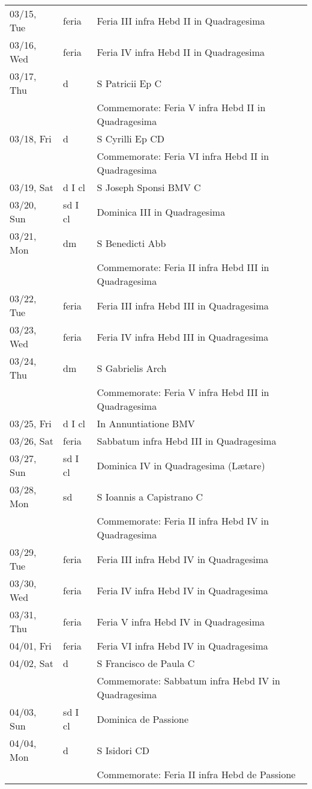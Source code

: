 \documentclass{article}
\begin{document}
\begin{longtable}{ l l l }
03/15, Tue & feria & Feria III infra Hebd II in Quadragesima\\
03/16, Wed & feria & Feria IV infra Hebd II in Quadragesima\\
03/17, Thu & d & S Patricii Ep C\\
 & & Commemorate: Feria V infra Hebd II in Quadragesima\\
03/18, Fri & d & S Cyrilli Ep CD\\
 & & Commemorate: Feria VI infra Hebd II in Quadragesima\\
03/19, Sat & d I cl & S Joseph Sponsi BMV C\\
03/20, Sun & sd I cl & Dominica III in Quadragesima\\
03/21, Mon & dm & S Benedicti Abb\\
 & & Commemorate: Feria II infra Hebd III in Quadragesima\\
03/22, Tue & feria & Feria III infra Hebd III in Quadragesima\\
03/23, Wed & feria & Feria IV infra Hebd III in Quadragesima\\
03/24, Thu & dm & S Gabrielis Arch\\
 & & Commemorate: Feria V infra Hebd III in Quadragesima\\
03/25, Fri & d I cl & In Annuntiatione BMV\\
03/26, Sat & feria & Sabbatum infra Hebd III in Quadragesima\\
03/27, Sun & sd I cl & Dominica IV in Quadragesima (Lætare)\\
03/28, Mon & sd & S Ioannis a Capistrano C\\
 & & Commemorate: Feria II infra Hebd IV in Quadragesima \\
03/29, Tue & feria & Feria III infra Hebd IV in Quadragesima \\
03/30, Wed & feria & Feria IV infra Hebd IV in Quadragesima \\
03/31, Thu & feria & Feria V infra Hebd IV in Quadragesima \\
04/01, Fri & feria & Feria VI infra Hebd IV in Quadragesima \\
04/02, Sat & d & S Francisco de Paula C\\
 & & Commemorate: Sabbatum infra Hebd IV in Quadragesima \\
04/03, Sun & sd I cl & Dominica de Passione\\
04/04, Mon & d & S Isidori CD\\
 & & Commemorate: Feria II infra Hebd de Passione\\

\end{longtable}
\end{document}
